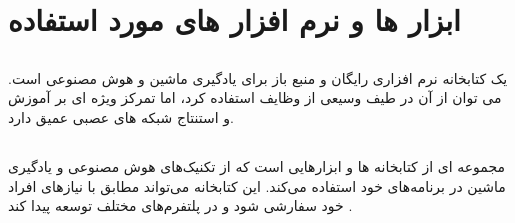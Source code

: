 \section{ابزار ها و نرم افزار های مورد استفاده}
\subsection{}
 یک کتابخانه نرم افزاری رایگان و منبع باز برای یادگیری ماشین و هوش مصنوعی است. می توان از آن در طیف وسیعی از وظایف استفاده کرد، اما تمرکز ویژه ای بر آموزش و استنتاج شبکه های عصبی عمیق دارد.

\subsection{}
 مجموعه ای از کتابخانه ها و ابزارهایی است که از تکنیک‌های هوش مصنوعی و یادگیری ماشین در برنامه‌های خود استفاده می‌کند. این کتابخانه می‌تواند مطابق با نیازهای افراد خود سفارشی شود و در پلتفرم‌های مختلف توسعه پیدا کند \cite{harris2021applying}.




